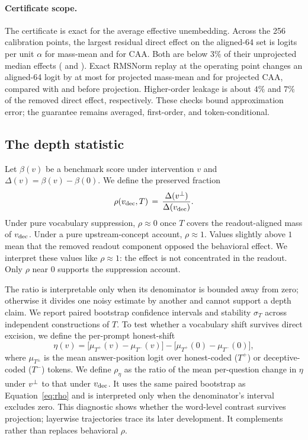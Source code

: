 \paragraph{Certificate scope.}
The certificate is exact for the average effective unembedding. Across the 256 calibration points, the largest residual direct effect on the aligned-64 set is \MmLeakMax{} logits per unit $\alpha$ for mass-mean and \DecLeakMax{} for CAA. Both are below $3\%$ of their unprojected median effects (\MmLeakScale{} and \DecLeakScale{}). Exact RMSNorm replay at the operating point changes an aligned-64 logit by at most \MmNonlinVperpMax{} for projected mass-mean and \DecNonlinVperpMax{} for projected CAA, compared with \MmNonlinVdecMax{} and \DecNonlinVdecMax{} before projection. Higher-order leakage is about $4\%$ and $7\%$ of the removed direct effect, respectively. These checks bound approximation error; the guarantee remains averaged, first-order, and token-conditional.

\subsection{The depth statistic}

Let $\beta(v)$ be a benchmark score under intervention $v$ and $\Delta(v) = \beta(v) - \beta(0)$. We define the preserved fraction
\begin{equation}
\rho(v_{\mathrm{dec}}, T) \,=\, \frac{\Delta(v^{\perp})}{\Delta(v_{\mathrm{dec}})} .
\label{eq:rho}
\end{equation}
Under pure vocabulary suppression, $\rho \approx 0$ once $T$ covers the readout-aligned mass of $v_{\mathrm{dec}}$. Under a pure upstream-concept account, $\rho \approx 1$. Values slightly above $1$ mean that the removed readout component opposed the behavioral effect. We interpret these values like $\rho \approx 1$: the effect is not concentrated in the readout. Only $\rho$ near $0$ supports the suppression account.

The ratio is interpretable only when its denominator is bounded away from zero; otherwise it divides one noisy estimate by another and cannot support a depth claim. We report paired bootstrap confidence intervals and stability $\sigma_T$ across independent constructions of $T$. To test whether a vocabulary shift survives direct excision, we define the per-prompt honest-shift
\begin{equation}
\eta(v) = \big[\mu_{T^{+}}(v) - \mu_{T^{-}}(v)\big] - \big[\mu_{T^{+}}(0) - \mu_{T^{-}}(0)\big],
\label{eq:eta}
\end{equation}
where $\mu_{T^{\pm}}$ is the mean answer-position logit over honest-coded ($T^{+}$) or deceptive-coded ($T^{-}$) tokens. We define $\rho_\eta$ as the ratio of the mean per-question change in $\eta$ under $v^{\perp}$ to that under $v_{\mathrm{dec}}$. It uses the same paired bootstrap as Equation~\ref{eq:rho} and is interpreted only when the denominator's interval excludes zero. This diagnostic shows whether the word-level contrast survives projection; layerwise trajectories trace its later development. It complements rather than replaces behavioral $\rho$.

